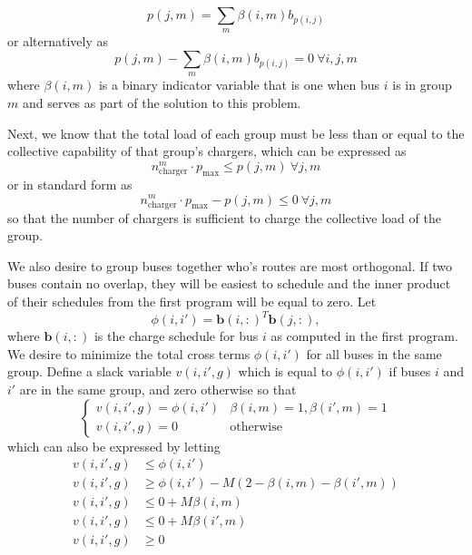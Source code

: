 \begin{equation*}
 p(j,m) = \sum_m\beta(i,m)b_{p(i,j)}
\end{equation*}
or alternatively as
\begin{equation}
	p(j,m) - \sum_m\beta(i,m)b_{p(i,j)} = 0 \ \forall i,j,m
\end{equation}
where $\beta(i,m)$ is a binary indicator variable that is one when bus $i$ is in group $m$ and serves as part of the solution to this problem. 
\par Next, we know that the total load of each group must be less than or equal to the collective capability of that group's chargers, which can be expressed as
\begin{equation*}
	n^m_{\text{charger}}\cdot p_{\text{max}} \le p(j,m) \ \forall j,m
\end{equation*}
or in standard form as 
\begin{equation}
	n^m_{\text{charger}}\cdot p_{\text{max}} - p(j,m) \le 0\ \forall j,m
\end{equation}
so that the number of chargers is sufficient to charge the collective load of the group. 
\par We also desire to group buses together who's routes are most orthogonal. If two buses contain no overlap, they will be easiest to schedule and the inner product of their schedules from the first program will be equal to zero. Let 
\begin{equation*}
\phi(i,i') = \mathbf{b}(i,:)^T\mathbf{b}(j,:),
\end{equation*}
where $\mathbf{b}(i,:)$ is the charge schedule for bus $i$ as computed in the first program. We desire to minimize the total cross terms $\phi(i,i')$ for all buses in the same group.  Define a slack variable $v(i,i',g)$ which is equal to $\phi(i,i')$ if buses $i$ and $i'$ are in the same group, and zero otherwise so that
\begin{equation*}
	\begin{cases}
		v(i,i',g) = \phi(i,i') & \beta(i,m) = 1, \beta(i',m) = 1 \\
		v(i,i',g) = 0 & \text{otherwise}
	\end{cases}
\end{equation*}
which can also be expressed by letting
\begin{equation*}\begin{aligned}
	v(i,i',g) &\le \phi(i,i') \\
	v(i,i',g) &\ge \phi(i,i') - M\left (2 - \beta(i,m) - \beta(i',m)\right ) \\
	v(i,i',g) &\le 0 + M\beta(i,m) \\
	v(i,i',g) &\le 0 + M\beta(i',m) \\
	v(i,i',g) &\ge 0  
\end{aligned}\end{equation*}
